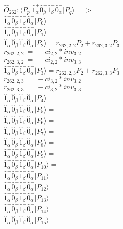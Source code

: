 \documentclass[14pt]{article}
\begin{document}
    $\hat{O}_{262}:  \langle{P_p}\vert \hat{1}_{\alpha}^{+}\hat{0}_{\beta}^{+}\hat{1}_{\beta}^{-}\hat{0}_{\alpha}^{-} \vert{P_q}\rangle => $ \\ 
    $ \hat{1}_{\alpha}^{+}\hat{0}_{\beta}^{+}\hat{1}_{\beta}^{-}\hat{0}_{\alpha}^{-} \vert{P_{0}}\rangle =  $ \\ 
    $ \hat{1}_{\alpha}^{+}\hat{0}_{\beta}^{+}\hat{1}_{\beta}^{-}\hat{0}_{\alpha}^{-} \vert{P_{1}}\rangle =  $ \\ 
    $ \hat{1}_{\alpha}^{+}\hat{0}_{\beta}^{+}\hat{1}_{\beta}^{-}\hat{0}_{\alpha}^{-} \vert{P_{2}}\rangle = {r}_{262,2,2}P_{2}+{r}_{262,3,2}P_{3} $ \\ 
    ${r}_{262,2,2}\ =\ -{ci}_{2,2}*{inv}_{3,2} $ \\ 
    ${r}_{262,3,2}\ =\ -{ci}_{2,2}*{inv}_{3,3} $ \\ 
    $ \hat{1}_{\alpha}^{+}\hat{0}_{\beta}^{+}\hat{1}_{\beta}^{-}\hat{0}_{\alpha}^{-} \vert{P_{3}}\rangle = {r}_{262,2,3}P_{2}+{r}_{262,3,3}P_{3} $ \\ 
    ${r}_{262,2,3}\ =\ -{ci}_{3,2}*{inv}_{3,2} $ \\ 
    ${r}_{262,3,3}\ =\ -{ci}_{3,2}*{inv}_{3,3} $ \\ 
    $ \hat{1}_{\alpha}^{+}\hat{0}_{\beta}^{+}\hat{1}_{\beta}^{-}\hat{0}_{\alpha}^{-} \vert{P_{4}}\rangle =  $ \\ 
    $ \hat{1}_{\alpha}^{+}\hat{0}_{\beta}^{+}\hat{1}_{\beta}^{-}\hat{0}_{\alpha}^{-} \vert{P_{5}}\rangle =  $ \\ 
    $ \hat{1}_{\alpha}^{+}\hat{0}_{\beta}^{+}\hat{1}_{\beta}^{-}\hat{0}_{\alpha}^{-} \vert{P_{6}}\rangle =  $ \\ 
    $ \hat{1}_{\alpha}^{+}\hat{0}_{\beta}^{+}\hat{1}_{\beta}^{-}\hat{0}_{\alpha}^{-} \vert{P_{7}}\rangle =  $ \\ 
    $ \hat{1}_{\alpha}^{+}\hat{0}_{\beta}^{+}\hat{1}_{\beta}^{-}\hat{0}_{\alpha}^{-} \vert{P_{8}}\rangle =  $ \\ 
    $ \hat{1}_{\alpha}^{+}\hat{0}_{\beta}^{+}\hat{1}_{\beta}^{-}\hat{0}_{\alpha}^{-} \vert{P_{9}}\rangle =  $ \\ 
    $ \hat{1}_{\alpha}^{+}\hat{0}_{\beta}^{+}\hat{1}_{\beta}^{-}\hat{0}_{\alpha}^{-} \vert{P_{10}}\rangle =  $ \\ 
    $ \hat{1}_{\alpha}^{+}\hat{0}_{\beta}^{+}\hat{1}_{\beta}^{-}\hat{0}_{\alpha}^{-} \vert{P_{11}}\rangle =  $ \\ 
    $ \hat{1}_{\alpha}^{+}\hat{0}_{\beta}^{+}\hat{1}_{\beta}^{-}\hat{0}_{\alpha}^{-} \vert{P_{12}}\rangle =  $ \\ 
    $ \hat{1}_{\alpha}^{+}\hat{0}_{\beta}^{+}\hat{1}_{\beta}^{-}\hat{0}_{\alpha}^{-} \vert{P_{13}}\rangle =  $ \\ 
    $ \hat{1}_{\alpha}^{+}\hat{0}_{\beta}^{+}\hat{1}_{\beta}^{-}\hat{0}_{\alpha}^{-} \vert{P_{14}}\rangle =  $ \\ 
    $ \hat{1}_{\alpha}^{+}\hat{0}_{\beta}^{+}\hat{1}_{\beta}^{-}\hat{0}_{\alpha}^{-} \vert{P_{15}}\rangle =  $ \\ 
    
\end{document}
